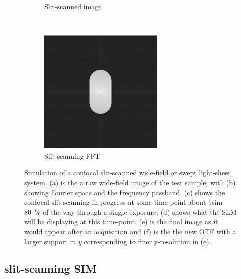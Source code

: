 \begin{figure}[h]
\begin{subfigure}[t]{0.23\textwidth}
      \caption{Slit-scanned image}
  \end{subfigure}~
  \begin{subfigure}[t]{0.23\textwidth}
      \centering
      \includegraphics[width=\textwidth]{widefield_slit/slitscanning_fft}
      \caption{Slit-scanning \gls{FFT}}
  \end{subfigure}
  \caption[Simulation of a confocal slit-scanned wide-field or swept light-sheet system]{Simulation of a confocal slit-scanned wide-field or swept light-sheet system.
  (a) is the a raw wide-field image of the test sample, with (b) showing Fourier space and the frequency passband.
  (c) shows the confocal \gls{slit-scanning} in progress at some time-point about \SI{\sim 80}{\percent} of the way through a single exposure;
  (d) shows what the \gls{SLM} will be displaying at this time-point.
  (e) is the final image as it would appear after an acquisition and (f) is the the new \gls{OTF} with a larger support in \(y\) corresponding to finer y-resolution in (e).
  }
  \label{fig:widefield_slit}
\end{figure}

\subsection{\Gls{slit-scanning} \gls{SIM}}

